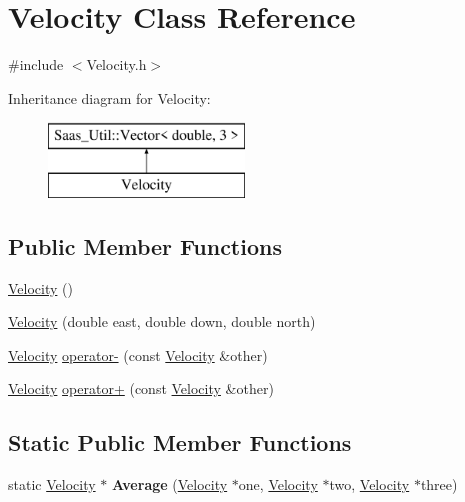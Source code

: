 \hypertarget{class_velocity}{}\section{Velocity Class Reference}
\label{class_velocity}


{\ttfamily \#include $<$Velocity.\+h$>$}

Inheritance diagram for Velocity\+:\begin{figure}[H]
\begin{center}
\leavevmode
\includegraphics[height=2.000000cm]{class_velocity}
\end{center}
\end{figure}
\subsection*{Public Member Functions}
\begin{DoxyCompactItemize}
\item 
\hyperlink{class_velocity_a852088c8d4dbb7e1beb0d793a57e9d11}{Velocity} ()
\item 
\hyperlink{class_velocity_ad2193f387838054fb78afaa6891182b8}{Velocity} (double east, double down, double north)
\item 
\hyperlink{class_velocity}{Velocity} \hyperlink{class_velocity_ac8e10d6b337b615de5694866a1022490}{operator-\/} (const \hyperlink{class_velocity}{Velocity} \&other)
\item 
\hyperlink{class_velocity}{Velocity} \hyperlink{class_velocity_ad7abed73672a6cd0388b9078dfa72a2e}{operator+} (const \hyperlink{class_velocity}{Velocity} \&other)
\end{DoxyCompactItemize}
\subsection*{Static Public Member Functions}
\begin{DoxyCompactItemize}
\item 
\hypertarget{class_velocity_aaa36eaa992630c8a13f54984f87ff46f}{}static \hyperlink{class_velocity}{Velocity} $\ast$ {\bfseries Average} (\hyperlink{class_velocity}{Velocity} $\ast$one, \hyperlink{class_velocity}{Velocity} $\ast$two, \hyperlink{class_velocity}{Velocity} $\ast$three)\label{class_velocity_aaa36eaa992630c8a13f54984f87ff46f}

\end{DoxyCompactItemize}
